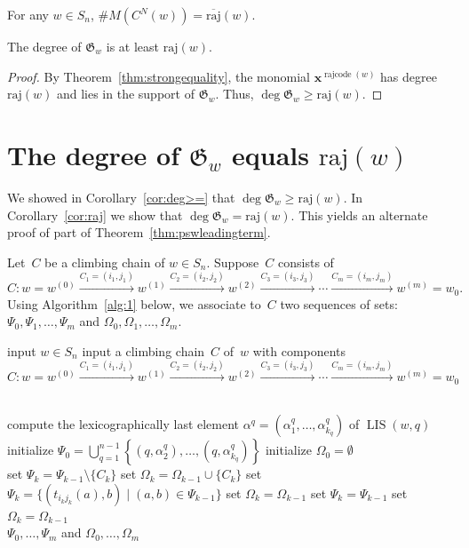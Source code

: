 \documentclass[ALCO]{cedram}
\newcommand{\absrajcode}[1]{\mathrm{raj}(#1)}
\newcommand{\absoverrajcode}[1]{\overline{\mathrm{raj}}(#1)}
\DeclareMathOperator{\LIS}{\mathrm{LIS}}
\DeclareMathOperator{\rr}{\mathrm{rajcode}}
\newcommand{\CN}{C^N}
\begin{document}
\begin{corollary}
	\label{cor:weakequality}		
	For any $w\in S_n$, $\#M(\CN(w)) = \absoverrajcode{w}$.
\end{corollary}

\begin{corollary} 
	\label{cor:deg>=}
	The degree of $\mathfrak{G}_w$ is at least $\absrajcode{w}$.
\end{corollary}
\begin{proof}
	By Theorem~\ref{thm:strongequality}, the monomial $\bm{x}^{\rr(w)}$ has degree $\absrajcode{w}$ and lies in the support of $\mathfrak{G}_w$. Thus, $\deg\mathfrak{G}_w\geq \absrajcode{w}$. 
\end{proof}


\section{The degree of \texorpdfstring{$\mathfrak{G}_w$}{Gw} equals \texorpdfstring{$\absrajcode{w}$}{w}}
\label{sec:raj}

We showed in Corollary~\ref{cor:deg>=} that $\deg\mathfrak{G}_w\geq \absrajcode{w}$. In Corollary~\ref{cor:raj} we show that $\deg\mathfrak{G}_w= \absrajcode{w}$. This yields an alternate proof of part of Theorem~\ref{thm:pswleadingterm}.

Let~$C$ be a climbing chain of $w\in S_n$. Suppose~$C$ consists of
\[C: w=w^{(0)} \xrightarrow{C_1=(i_1,j_1)} w^{(1)} \xrightarrow{C_2=(i_2,j_2)} w^{(2)}\xrightarrow{C_3=(i_3,j_3)}\cdots\xrightarrow{C_m=(i_m,j_m)} w^{(m)} = w_0. \]
Using Algorithm~\ref{alg:1} below, we associate to~$C$ two sequences of sets: $\Psi_0,\Psi_1,\ldots,\Psi_m$ and $\Omega_0,\Omega_1,\ldots,\Omega_m$.

\begin{algorithm}
	\caption{}
	\label{alg:1}
	\begin{algorithmic}
		\State input $w\in S_n$
		\State input a climbing chain~$C$ of~$w$ with components
		\[C: w=w^{(0)} \xrightarrow{C_1=(i_1,j_1)} w^{(1)} \xrightarrow{C_2=(i_2,j_2)} w^{(2)}\xrightarrow{C_3=(i_3,j_3)}\cdots\xrightarrow{C_m=(i_m,j_m)} w^{(m)} = w_0\]
		
		\\
		\State compute the lexicographically last element $\alpha^{q}=(\alpha^q_1,\ldots,\alpha^q_{k_q})$ of $\LIS(w,q)$ 
		\EndFor
		\State initialize $\Psi_0 = \bigcup_{q=1}^{n-1}\left\{(q,\alpha^q_2),\ldots,(q,\alpha^q_{k_q}) \right\}$
		\State initialize $\Omega_0=\emptyset$
		\\
		
		\State set $\Psi_k=\Psi_{k-1}\setminus\{C_k\}$
		\State set $\Omega_k = \Omega_{k-1}\cup\{C_k\}$
		\State set $\Psi_k=\{(t_{i_kj_k}(a), b) \mid (a,b)\in \Psi_{k-1} \}$
		\State set $\Omega_k=\Omega_{k-1}$
		\Else
		\State set $\Psi_k=\Psi_{k-1}$
		\State set $\Omega_k = \Omega_{k-1}$
		\EndIf
		\EndFor\\
		\Return $\Psi_0,\ldots,\Psi_m$ and $\Omega_0,\ldots,\Omega_m$
	\end{algorithmic}
\end{algorithm}
\end{document}
